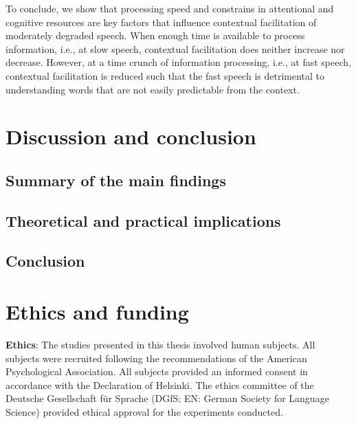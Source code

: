 \documentclass[a4paper, nobind]{templates/ociamthesis}
\begin{document}
To conclude, we show that processing speed and constrains in attentional and cognitive resources are key factors that influence contextual facilitation of moderately degraded speech.
When enough time is available to process information, i.e., at slow speech, contextual facilitation does neither increase nor decrease.
However, at a time crunch of information processing, i.e., at fast speech, contextual facilitation is reduced such that the fast speech is detrimental to understanding words that are not easily predictable from the context.

\hypertarget{discussion-and-conclusion}{%
\chapter{Discussion and conclusion}\label{discussion-and-conclusion}}

\hypertarget{summary-of-the-main-findings}{%
\section{Summary of the main findings}\label{summary-of-the-main-findings}}

\hypertarget{theoretical-and-practical-implications}{%
\section{Theoretical and practical implications}\label{theoretical-and-practical-implications}}

\hypertarget{conclusion-3}{%
\section{Conclusion}\label{conclusion-3}}

\minitoc 

\hypertarget{ethics-and-funding}{%
\chapter{Ethics and funding}\label{ethics-and-funding}}

\noindent 

\textbf{Ethics}: The studies presented in this thesis involved human subjects.
All subjects were recruited following the recommendations of the American Psychological Association.
All subjects provided an informed consent in accordance with the Declaration of Helsinki.
The ethics committee of the Deutsche Gesellschaft für Sprache (DGfS; EN: German Society for Language Science) provided ethical approval for the experiments conducted.
\end{document}
